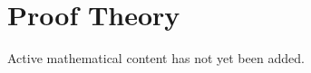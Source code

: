 
\section{Proof Theory}

\begin{remark*}
Active mathematical content has not yet been added.
\end{remark*}
